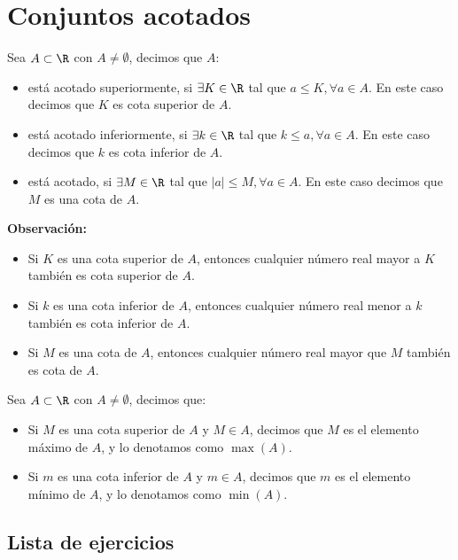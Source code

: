 \section*{Conjuntos acotados}

 Sea $A\subset \R$ con $A\neq \emptyset$, decimos que $A$:
\begin{itemize}
 \item está acotado superiormente, si $\exists K\in \R$ tal que $a \leq K, \forall a\in A$. En este caso decimos que $K$ es cota superior de $A$.

 \item está acotado inferiormente, si $\exists k\in \R$ tal que $k \leq a, \forall a\in A$. En este caso decimos que $k$ es cota inferior de $A$.

 \item está acotado, si $\exists M\in \R$ tal que $|a|\leq M,\forall a \in A$. En este caso decimos que $M$ es una cota de $A$.
\end{itemize}

\textbf{Observación:}
\begin{itemize}
  \item Si $K$ es una cota superior de $A$, entonces cualquier número real mayor a $K$ también es cota superior de $A$. 
  \item Si $k$ es una cota inferior de $A$, entonces cualquier número real menor a $k$ también es cota inferior de $A$.
  \item Si $M$ es una cota de $A$, entonces cualquier número real mayor que $M$ también es cota de $A$.
\end{itemize}

 Sea $A\subset \R$ con $A\neq \emptyset$, decimos que:
\begin{itemize}
  \item Si $M$ es una cota superior de $A$ y $M\in A$, decimos que $M$ es el elemento máximo de $A$, y lo denotamos como $\max(A)$.
  \item Si $m$ es una cota inferior de $A$ y $m\in A$, decimos que $m$ es el elemento mínimo de $A$, y lo denotamos como $\min(A)$.
\end{itemize}


\subsection*{Lista de ejercicios}

